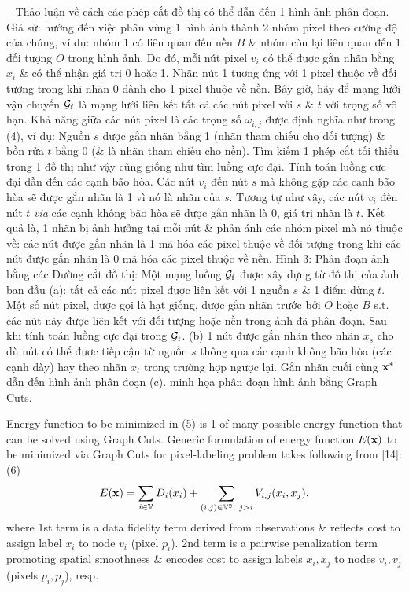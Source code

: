 \documentclass{article}
\begin{document}
\begin{itemize}
\begin{itemize}
        -- Thảo luận về cách các phép cắt đồ thị có thể dẫn đến 1 hình ảnh phân đoạn. Giả sử: hướng đến việc phân vùng 1 hình ảnh thành 2 nhóm pixel theo cường độ của chúng, ví dụ: nhóm 1 có liên quan đến nền $B$ \& nhóm còn lại liên quan đến 1 đối tượng $O$ trong hình ảnh. Do đó, mỗi nút pixel $v_i$ có thể được gắn nhãn bằng $x_i$ \& có thể nhận giá trị 0 hoặc 1. Nhãn nút 1 tương ứng với 1 pixel thuộc về đối tượng trong khi nhãn 0 dành cho 1 pixel thuộc về nền. Bây giờ, hãy để mạng lưới vận chuyển ${\cal G}_{\rm f}$ là mạng lưới liên kết tất cả các nút pixel với $s$ \& $t$ với trọng số vô hạn. Khả năng giữa các nút pixel là các trọng số $\omega_{i,j}$ được định nghĩa như trong (4), ví dụ: Nguồn $s$ được gắn nhãn bằng 1 (nhãn tham chiếu cho đối tượng) \& bồn rửa $t$ bằng 0 (\& là nhãn tham chiếu cho nền). Tìm kiếm 1 phép cắt tối thiểu trong 1 đồ thị như vậy cũng giống như tìm luồng cực đại. Tính toán luồng cực đại dẫn đến các cạnh bão hòa. Các nút $v_i$ đến nút $s$ mà không gặp các cạnh bão hòa sẽ được gắn nhãn là 1 vì nó là nhãn của $s$. Tương tự như vậy, các nút $v_i$ đến nút $t$ {\it via} các cạnh không bão hòa sẽ được gắn nhãn là 0, giá trị nhãn là $t$. Kết quả là, 1 nhãn bị ảnh hưởng tại mỗi nút \& phản ánh các nhóm pixel mà nó thuộc về: các nút được gắn nhãn là 1 mã hóa các pixel thuộc về đối tượng trong khi các nút được gắn nhãn là 0 mã hóa các pixel thuộc về nền. {\sf Hình 3: Phân đoạn ảnh bằng các Đường cắt đồ thị: Một mạng luồng ${\cal G}_{\rm f}$ được xây dựng từ đồ thị của ảnh ban đầu (a): tất cả các nút pixel được liên kết với 1 nguồn $s$ \& 1 điểm dừng $t$. Một số nút pixel, được gọi là hạt giống, được gắn nhãn trước bởi $O$ hoặc $B$ s.t. các nút này được liên kết với đối tượng hoặc nền trong ảnh đã phân đoạn. Sau khi tính toán luồng cực đại trong ${\cal G}_{\rm f}$. (b) 1 nút được gắn nhãn theo nhãn $x_s$ cho dù nút có thể được tiếp cận từ nguồn $s$ thông qua các cạnh không bão hòa (các cạnh dày) hay theo nhãn $x_t$ trong trường hợp ngược lại. Gắn nhãn cuối cùng ${\bf x}^*$ dẫn đến hình ảnh phân đoạn (c).} minh họa phân đoạn hình ảnh bằng Graph Cuts.
        
        Energy function to be minimized in (5) is 1 of many possible energy function that can be solved using Graph Cuts. Generic formulation of energy function $E({\bf x})$ to be minimized via Graph Cuts for pixel-labeling problem takes following from [14]: (6)
        \begin{equation*}
            E({\bf x}) = \sum_{i\in\mathbb{V}} D_i(x_i) + \sum_{(i,j)\in\mathbb{V}^2,\ j > i} V_{i,j}(x_i,x_j),
        \end{equation*}
        where 1st term is a data fidelity term derived from observations \& reflects cost to assign label $x_i$ to node $v_i$ (pixel $p_i$). 2nd term is a pairwise penalization term promoting spatial smoothness \& encodes cost to assign labels $x_i,x_j$ to nodes $v_i,v_j$ (pixels $p_i,p_j$), resp.
        

\end{itemize}
\end{itemize}
\end{document}
